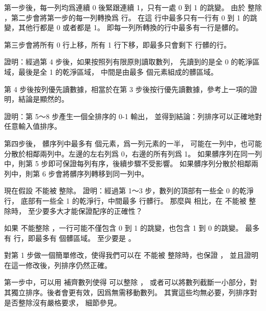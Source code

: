 \startANSWER
第一步後，每一列均爲連續 0 後緊跟連續 1，只有一處 0 到 1 的跳變。
由於  整除 ，第二步會將第一步的每一列轉換爲  行。
在這  行中最多只有一行有 0 到 1 的跳變，其他行都是 0 或者都是 1。
即每一列所轉換的行中最多有一行是髒的。

第三步會將所有 0 行上移，所有 1 行下移，即最多只會剩下  行髒的行。
\stopANSWER

\startitem
證明：經過第 4 步後，如果按照列有限原則讀取數列，
先讀到的是全 0 的乾淨區域，最後是全 1 的乾淨區域，
中間是由最多  個元素組成的髒區域。
\stopitem

\startANSWER
第 4 步後按列優先讀數據，相當於在第 3 步後按行優先讀數據，參考上一項的證明，結論是顯然的。
\stopANSWER

\startitem
證明：第 5～8 步產生一個全排序的 0-1 輸出，
並得到結論：列排序可以正確地對任意輸入值排序。
\stopitem

\startANSWER
第四步後， 髒序列中最多有  個元素，爲一列元素的一半，
可能在一列中，也可能分散於相鄰兩列中。左邊的左右列爲 0，右邊的所有列爲 1。
如果髒序列在同一列中，則第 5 步即可保證每列有序，後續步驟不受影響。
如果髒序列分散於相鄰兩列中，則第 6 步會將髒序列轉移到同一列中。
\stopANSWER

\startitem
現在假設  不能被  整除。
證明：經過第 1～3 步，數列的頂部有一些全 0 的乾淨行，
底部有一些全 1 的乾淨行，中間最多  行髒行。
那麼與  相比，在  不能被  整除時，  至少要多大才能保證配序的正確性？
\stopitem

\startANSWER
如果  不能整除 ，一行可能不僅包含 0 到 1 的跳變，也包含 1 到 0 的跳變。
最多有   行，即最多有  個髒區域。
  至少要是 。
\stopANSWER

\startitem
對第 1 步做一個簡單修改，使得我們可以在  不能被  整除時，也保證 ，
並且證明在這一修改後，列排序仍然正確。
\stopitem

\startANSWER
第一步中，可以用 \m{+\infty} 補齊數列使得  可以整除 ，
或者可以將數列截斷一小部分，對其獨立排序。後者會更有效，因爲無需移動數列。
其實這些均無必要，列排序對是否整除沒有嚴格要求，
細節參見。
\stopANSWER
\stopigBase

\stopPROBLEM

\stopsubject
